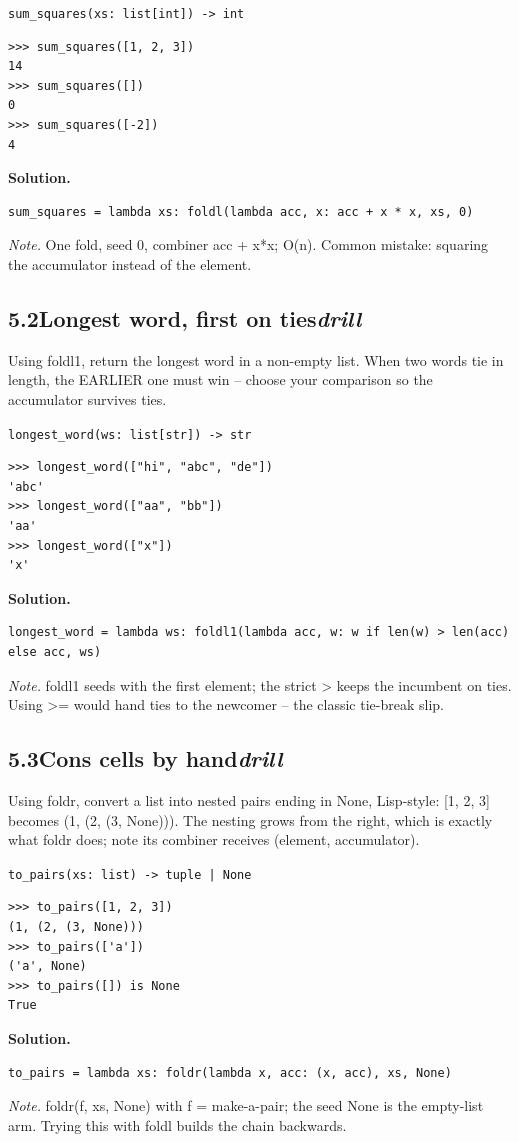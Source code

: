 \documentclass[10pt,letterpaper]{book}
\begin{document}
\noindent\texttt{sum\_squares(xs: list[int]) -> int}
\begin{lstlisting}[style=ex]
>>> sum_squares([1, 2, 3])
14
>>> sum_squares([])
0
>>> sum_squares([-2])
4
\end{lstlisting}
\noindent\textbf{Solution.}
\begin{lstlisting}[style=code]
sum_squares = lambda xs: foldl(lambda acc, x: acc + x * x, xs, 0)
\end{lstlisting}
\noindent\textit{Note.} One fold, seed 0, combiner acc + x*x; O(n). Common mistake: squaring the accumulator instead of the element.

\subsection*{5.2\quad Longest word, first on ties\hfill\textnormal{\textit{drill}}}
Using foldl1, return the longest word in a non-empty list. When two words tie in length, the EARLIER one must win -- choose your comparison so the accumulator survives ties.

\noindent\texttt{longest\_word(ws: list[str]) -> str}
\begin{lstlisting}[style=ex]
>>> longest_word(["hi", "abc", "de"])
'abc'
>>> longest_word(["aa", "bb"])
'aa'
>>> longest_word(["x"])
'x'
\end{lstlisting}
\noindent\textbf{Solution.}
\begin{lstlisting}[style=code]
longest_word = lambda ws: foldl1(lambda acc, w: w if len(w) > len(acc) else acc, ws)
\end{lstlisting}
\noindent\textit{Note.} foldl1 seeds with the first element; the strict > keeps the incumbent on ties. Using >= would hand ties to the newcomer -- the classic tie-break slip.

\subsection*{5.3\quad Cons cells by hand\hfill\textnormal{\textit{drill}}}
Using foldr, convert a list into nested pairs ending in None, Lisp-style: [1, 2, 3] becomes (1, (2, (3, None))). The nesting grows from the right, which is exactly what foldr does; note its combiner receives (element, accumulator).

\noindent\texttt{to\_pairs(xs: list) -> tuple | None}
\begin{lstlisting}[style=ex]
>>> to_pairs([1, 2, 3])
(1, (2, (3, None)))
>>> to_pairs(['a'])
('a', None)
>>> to_pairs([]) is None
True
\end{lstlisting}
\noindent\textbf{Solution.}
\begin{lstlisting}[style=code]
to_pairs = lambda xs: foldr(lambda x, acc: (x, acc), xs, None)
\end{lstlisting}
\noindent\textit{Note.} foldr(f, xs, None) with f = make-a-pair; the seed None is the empty-list arm. Trying this with foldl builds the chain backwards.
\end{document}
